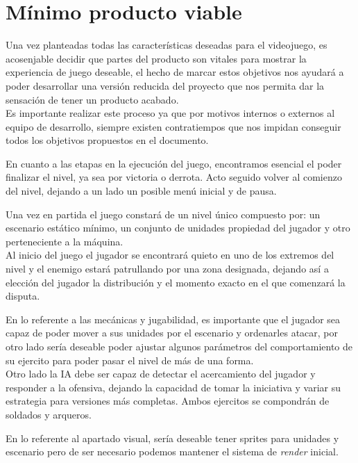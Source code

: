 \section{Mínimo producto viable}
Una vez planteadas todas las características deseadas para el videojuego, es acosenjable
decidir que partes del producto son vitales para mostrar la experiencia
de juego deseable, el hecho de marcar estos objetivos nos ayudará a poder desarrollar una
versión reducida del proyecto que nos permita dar la sensación de tener un producto acabado.\\
Es importante realizar este proceso ya que por motivos internos o externos al equipo de desarrollo,
siempre existen contratiempos que nos impidan conseguir todos los objetivos propuestos en el
documento.

En cuanto a las etapas en la ejecución del juego, encontramos esencial el poder finalizar el nivel,
ya sea por victoria o derrota. Acto seguido volver al comienzo del nivel, dejando a un lado un
posible menú inicial y de pausa.

Una vez en partida el juego constará de un nivel único compuesto por: un escenario estático
mínimo, un conjunto de unidades propiedad del jugador y otro perteneciente a la máquina.\\
Al inicio del juego el jugador se encontrará quieto en uno de los extremos del nivel y el enemigo 
estará patrullando por una zona designada, dejando así a elección del jugador la distribución y el
momento exacto en el que comenzará la disputa.

En lo referente a las mecánicas y jugabilidad, es importante que el jugador sea capaz de poder
mover a sus unidades por el escenario y ordenarles atacar, por otro lado sería deseable poder
ajustar algunos parámetros del comportamiento de su ejercito para poder pasar el nivel de más
de una forma.\\
Otro lado la \ac{IA} debe ser capaz de detectar el acercamiento del jugador y responder a la
ofensiva, dejando la capacidad de tomar la iniciativa y variar su estrategia para versiones
más completas. Ambos ejercitos se compondrán de soldados y arqueros.

En lo referente al apartado visual, sería deseable tener sprites para unidades y escenario pero
de ser necesario podemos mantener el sistema de \textit{render} inicial.
